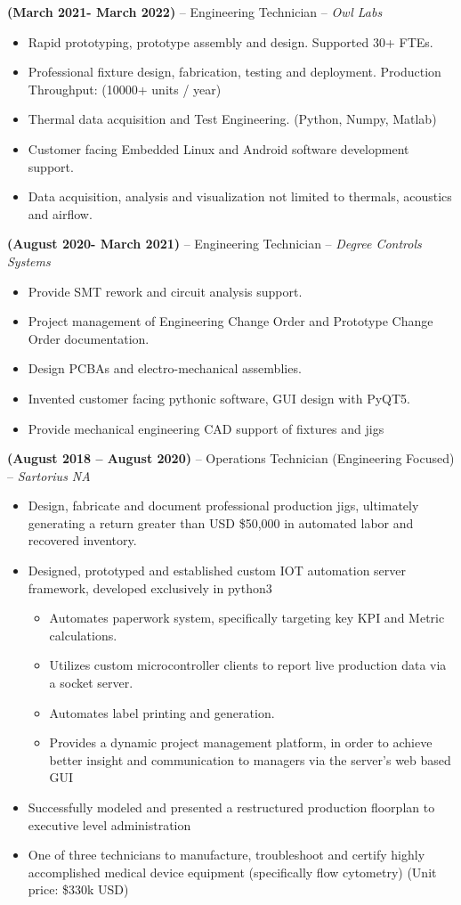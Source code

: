 \documentclass[11pt,a4paper]{article}
\newcommand{\jobentry}[2]{
  \vspace{0.5\baselineskip}\textbf{#1} -- #2 
}
\begin{document}
\jobentry{(March 2021- March 2022)}{Engineering Technician -- \textit{Owl Labs}}
\begin{itemize}
\item Rapid prototyping, prototype assembly and design. Supported 30+ FTEs.
\item Professional fixture design, fabrication, testing and deployment. Production Throughput: (10000+ units / year)
\item Thermal data acquisition and Test Engineering. (Python, Numpy, Matlab)
\item Customer facing Embedded Linux and Android software development support.
\item Data acquisition, analysis and visualization not limited to thermals, acoustics and airflow.
\end{itemize}
\jobentry{(August 2020- March 2021)}{Engineering Technician -- \textit{Degree Controls Systems}}
\begin{itemize}
\item Provide SMT rework and circuit analysis support.
\item Project management of Engineering Change Order and Prototype Change Order documentation.
\item Design PCBAs and electro-mechanical assemblies.
\item Invented customer facing pythonic software, GUI design with PyQT5.
\item Provide mechanical engineering CAD support of fixtures and jigs
\end{itemize}
\jobentry{(August 2018 -- August 2020)}{Operations Technician (Engineering Focused) -- \textit{Sartorius NA}}
\begin{itemize}
\item Design, fabricate and document professional production jigs, ultimately generating a return greater than USD \$50,000 in automated labor and recovered inventory.
\item Designed, prototyped and established custom IOT automation server framework, developed exclusively in python3
  \begin{itemize}
  \item Automates paperwork system, specifically targeting key KPI and Metric calculations.
  \item Utilizes custom microcontroller clients to report live production data via a socket server.
  \item Automates label printing and generation.
  \item Provides a dynamic project management platform, in order to achieve better insight and communication to managers via the server's web based GUI
  \end{itemize}
\item Successfully modeled and presented a restructured production floorplan to executive level administration
\item One of three technicians to manufacture, troubleshoot and certify highly accomplished medical device equipment (specifically flow cytometry) (Unit price: \$330k USD)
\end{itemize}
\end{document}
